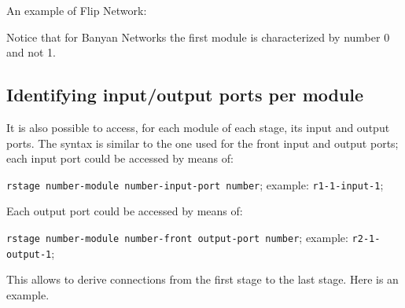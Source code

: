 \documentclass{ltxdoc}
\begin{document}
An example of Flip Network:
\begin{codeexample}[]
\end{codeexample}
Notice that for Banyan Networks the first module is characterized by number 0 and not 1.

\subsection{Identifying input/output ports per module}

It is also possible to access, for each module of each stage, its input and output ports. The syntax is similar to the one used for the front input and output ports; each input port could be accessed by means of:
\begin{flushleft}
\verb|r|\bgroup\color{red!75!black}\verb|stage number|\egroup\verb|-|\bgroup\color{red!75!black}\verb|module number|\egroup\verb|-|\bgroup\color{red!75!black}\verb|input|\egroup\verb|-|\bgroup\color{red!75!black}\verb|port number|\egroup; example: \verb|r1-1-input-1|;
\end{flushleft}
Each output port could be accessed by means of:
\begin{flushleft}
\verb|r|\bgroup\color{red!75!black}\verb|stage number|\egroup\verb|-|\bgroup\color{red!75!black}\verb|module number|\egroup\verb|-|\bgroup\color{red!75!black}\verb|front output|\egroup\verb|-|\bgroup\color{red!75!black}\verb|port number|\egroup; example: \verb|r2-1-output-1|;
\end{flushleft}
This allows to derive connections from the first stage to the last stage. Here is an example. 
\end{document}

